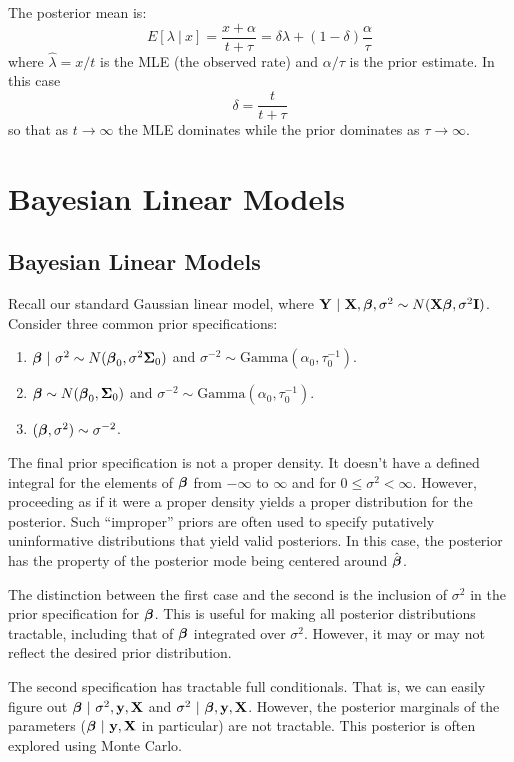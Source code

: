 The posterior mean is:
$$
E[ \lambda ~|~ x]  = \frac{x + \alpha}{t + \tau}
= \delta \hat \lambda + (1 - \delta) \frac{\alpha}{\tau}
$$
where $\hat \lambda = x / t$ is the MLE (the observed rate) and
$\alpha / \tau$ is the prior estimate. In this case 
$$
\delta = \frac{t}{t + \tau}
$$
so that as $t \rightarrow \infty$ the MLE dominates while the prior
dominates as $\tau \rightarrow \infty$. 


\section{Bayesian Linear Models}
\subsection{Bayesian Linear Models}

Recall our standard Gaussian linear model, where $\mathbf{Y} ~|~ \mathbf{X}, \boldsymbol{\beta}, \sigma^2
\sim N(\mathbf{X} \boldsymbol{\beta}, \sigma^2 \mathbf{I})$. Consider three common prior specifications:

\begin{enumerate}
\item $\boldsymbol{\beta} ~|~ \sigma^2 \sim N(\boldsymbol{\beta}_0, \sigma^2 \boldsymbol{\Sigma}_0)$ and $\sigma^{-2} \sim \mbox{Gamma}(\alpha_0, \tau^{-1}_0)$.
\item $\boldsymbol{\beta} \sim N(\boldsymbol{\beta}_0, \boldsymbol{\Sigma}_0)$ and $\sigma^{-2} \sim \mbox{Gamma}(\alpha_0, \tau^{-1}_0)$.
\item $(\boldsymbol{\beta}, \sigma^2) \sim \sigma^{-2}$.
\end{enumerate}
The final prior specification is not a proper density. It doesn't have a defined integral for
the elements of $\boldsymbol{\beta}$ from $-\infty$ to $\infty$ and for $0\leq \sigma^2 < \infty$. However,
proceeding as if it were a proper density yields a proper distribution for the posterior. 
Such ``improper'' priors are often used to specify putatively uninformative distributions that
yield valid posteriors. In this case, the posterior has the property of the posterior mode
being centered around $\hat {\boldsymbol{\beta}}$. 

The distinction between the first case and the second is the inclusion of $\sigma^2$ in
the prior specification for $\boldsymbol{\beta}$. This is useful for making all posterior distributions
tractable, including that of $\boldsymbol{\beta}$ integrated over $\sigma^2$. However, it may or may
not reflect the desired prior distribution. 

The second specification has tractable full conditionals. That is, we can easily figure out
$\boldsymbol{\beta} ~|~ \sigma^2, \mathbf{y}, \mathbf{X}$ and $\sigma^2 ~|~ \boldsymbol{\beta}, \mathbf{y}, \mathbf{X}$. However, the posterior
marginals of the parameters ($\boldsymbol{\beta} ~|~ \mathbf{y}, \mathbf{X}$ in particular) are not tractable. This posterior
is often explored using Monte Carlo.


